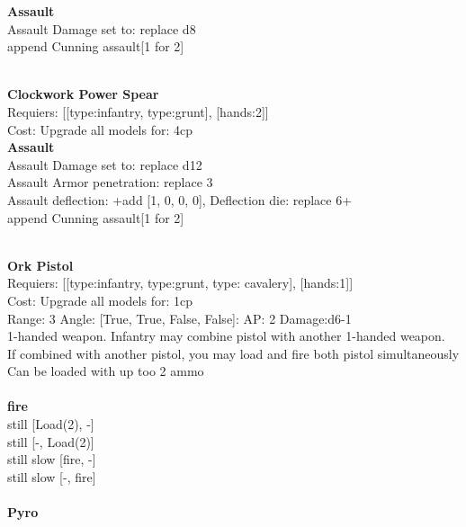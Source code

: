 {\bf Assault} \ \\
Assault Damage set to: replace d8
\\ 

append Cunning assault[1 for 2]


\ \\
{\bf Clockwork Power Spear } \\

Requiers: [[type:infantry, type:grunt], [hands:2]] \\
Cost: Upgrade all models for: 4cp \\




{\bf Assault} \ \\
Assault Damage set to: replace d12
\\ 
Assault Armor penetration: replace 3 
\\ 
Assault deflection: +add [1, 0, 0, 0], Deflection die: replace 6+
\\ 

append Cunning assault[1 for 2]


\ \\
{\bf Ork Pistol } \\

Requiers: [[type:infantry, type:grunt, type: cavalery], [hands:1]] \\
Cost: Upgrade all models for: 1cp \\


Range: 3  Angle: [True, True, False, False]: AP: 2 Damage:d6-1 \\
1-handed weapon. Infantry may combine pistol with another 1-handed weapon.\\ 
If combined with another pistol, you may load and fire both pistol simultaneously\\ 
Can be loaded with up too 2 ammo\\ 







\ \\ {\bf fire } \\
still [Load(2), -] \\
still [-, Load(2)] \\
still slow [fire, -] \\
still slow [-, fire] \\

\ \\
{\bf Pyro } \\


